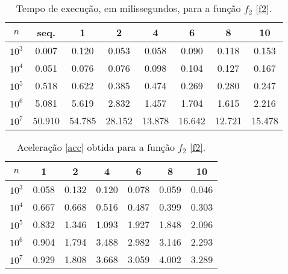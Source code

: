 \documentclass{article}
\begin{document}
      \begin{table}
        \centering
        \begin{tabular}{||c c c c c c c c||}
          \hline
          $n$ & seq. & 1 & 2 & 4 & 6 & 8 & 10 \\ 
          \hline \hline
          $10^{3}$ & 0.007 & 0.120 & 0.053 & 0.058 & 0.090 & 0.118 & 0.153 \\ 
          \hline 
          $10^{4}$ & 0.051 & 0.076 & 0.076 & 0.098 & 0.104 & 0.127 & 0.167 \\ 
          \hline 
          $10^{5}$ & 0.518 & 0.622 & 0.385 & 0.474 & 0.269 & 0.280 & 0.247 \\ 
          \hline 
          $10^{6}$ & 5.081 & 5.619 & 2.832 & 1.457 & 1.704 & 1.615 & 2.216 \\ 
          \hline 
          $10^{7}$ & 50.910 & 54.785 & 28.152 & 13.878 & 16.642 & 12.721 & 15.478 \\ 
          \hline 
        \end{tabular}
        \caption{Tempo de execução, em milissegundos, para a função $f_2$ \eqref{f2}.}
        \label{f2t}
      \end{table}
    
        \begin{table}
          \centering
          \begin{tabular}{||c c c c c c c||}
            \hline
            $n$ & 1 & 2 & 4 & 6 & 8 & 10 \\ 
            \hline \hline
            $10^{3}$ & 0.058 & 0.132 & 0.120 & 0.078 & 0.059 & 0.046 \\ 
            \hline 
            $10^{4}$ & 0.667 & 0.668 & 0.516 & 0.487 & 0.399 & 0.303 \\ 
            \hline 
            $10^{5}$ & 0.832 & 1.346 & 1.093 & 1.927 & 1.848 & 2.096 \\ 
            \hline 
            $10^{6}$ & 0.904 & 1.794 & 3.488 & 2.982 & 3.146 & 2.293 \\ 
            \hline 
            $10^{7}$ & 0.929 & 1.808 & 3.668 & 3.059 & 4.002 & 3.289 \\ 
            \hline 
          \end{tabular}
          \caption{Aceleração \eqref{acc} obtida para a função $f_2$ \eqref{f2}. }
          \label{f2a}
        \end{table}
\end{document}
